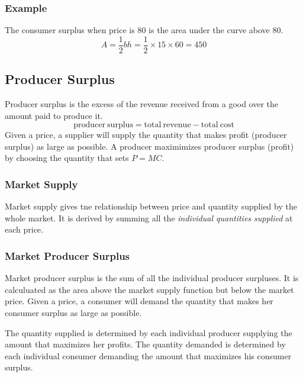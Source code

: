 \documentclass[letterpaper, 12pt]{article}
\begin{document}
\subsubsection{Example}
\begin{center}
\end{center}
The consumer surplus when price is 80 is the area under the curve above 80.
\[ A = \frac{1}{2}bh = \frac{1}{2}\times15\times60 = 450 \]

\subsection{Producer Surplus}
Producer surplus is the excess of the revenue received from a good over the
amount paid to produce it.
\[ \mathrm{producer\ surplus} = \mathrm{total\ revenue}-\mathrm{total\ cost} \]
Given a price, a supplier will supply the quantity that makes profit (producer
surplus) as large as possible. A producer maximimizes producer surplus (profit)
by choosing the quantity that sets \( P = MC \).

\subsubsection{Market Supply}
Market supply gives tne relationship between price and quantity supplied by the
whole market. It is derived by summing all the \textit{individual quantities
supplied} at each price.

\subsubsection{Market Producer Surplus}
Market producer surplus is the sum of all the individual producer surpluses. It
is calculuated as the area above the market supply function but below the market
price. Given a price, a consumer will demand the quantity that makes her
consumer surplus as large as possible. \par
The quantity supplied is determined by each individual producer supplying the
amount that maximizes her profits. The quantity demanded is determined by each
individual consumer demanding the amount that maximizes his consumer surplus.
\end{document}
